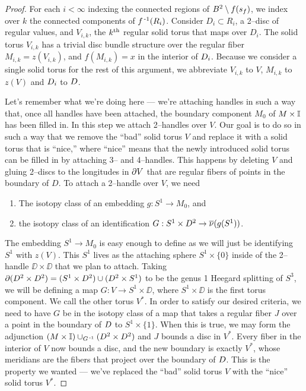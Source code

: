 \begin{proof}
	For each $i<\infty$ indexing the connected regions of $B^2\setminus f(s_f)$, we index over $k$ the connected components of $f^{\,\text{-}1}(R_i)$.
	Consider $D_i\subset R_i$, a 2--disc of regular values, and $V_{i,k}$, the $k^{\text{th}}$ regular solid torus that maps over $D_i$.
	The solid torus $V_{i,k}$ has a trivial disc bundle structure over the regular fiber $M_{i,k}=z(V_{i,k})$, and $f(M_{i,k})=x$ in the interior of $D_i$.
	Because we consider a single solid torus for the rest of this argument, we abbreviate $V_{i,k}$ to $V$, $M_{i,k}$ to $z(V)$ and $D_i$ to $D$.

	Let's remember what we're doing here --- we're attaching handles in such a way that, once all handles have been attached, the boundary component $M_0$ of $M\times\mathbb{I}$ has been filled in.
	In this step we attach 2--handles over $V$.
	Our goal is to do so in such a way that we remove the ``bad'' solid torus $V$ and replace it with a solid torus that is ``nice,'' where ``nice'' means that the newly introduced solid torus can be filled in by attaching 3-- and 4--handles.
	This happens by deleting $V$ and gluing 2--discs to the longitudes in $\partial V$ that are regular fibers of points in the boundary of $D$.
	To attach a 2--handle over $V$, we need
	\begin{enumerate}
		\item The isotopy class of an embedding $g:S^1\to M_0$, and
		\item the isotopy class of an identification $G:S^1\times D^2\to\overline{\nu}(g(S^1))$.
	\end{enumerate}
	The embedding $S^1\to M_0$ is easy enough to define as we will just be identifying $S^1$ with $z(V)$.
	This $S^1$ lives as the attaching sphere $S^1\times\{0\}$ inside of the 2--handle $\DD\times\DD$ that we plan to attach.
	Taking $\partial (D^2\times D^2)=(S^1\times D^2)\cup(D^2\times S^1)$ to be the genus 1 Heegard splitting of $S^3$, we will be defining a map $G:V\to S^1\times\DD$, where $S^1\times\DD$ is the first torus component.
	We call the other torus $V^*$.
	In order to satisfy our desired criteria, we need to have $G$ be in the isotopy class of a map that takes a regular fiber $J$ over a point in the boundary of $D$ to $S^1\times\{1\}$.
	When this is true, we may form the adjunction $(M\times\mathbb{I})\cup_{G^{\,\text{-}1}}(D^2\times D^2)$ and $J$ bounds a disc in $V^*$.
	Every fiber in the interior of $V$ now bounds a disc, and the new boundary is exactly $V^*$, whose meridians are the fibers that project over the boundary of $D$.
	This is the property we wanted --- we've replaced the ``bad'' solid torus $V$ with the ``nice'' solid torus $V^*$.
	

\end{proof}
